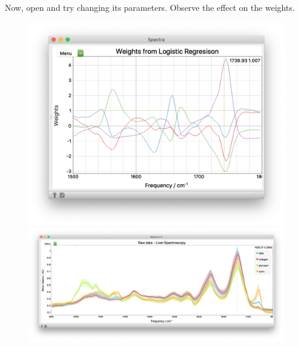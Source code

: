 Now, open  and try changing its parameters. Observe the effect on the weights.

\begin{figure}[h]
\hspace{-1cm}
  {\includegraphics[scale=0.35]{graphics/ch-spectra_classification/sp_classification-fig5a.png}}
  {\includegraphics[scale=0.35]{graphics/ch-spectra_classification/sp_classification-fig5b.png}}
  \label{fig:spectra_classification-fig5}
\end{figure}
